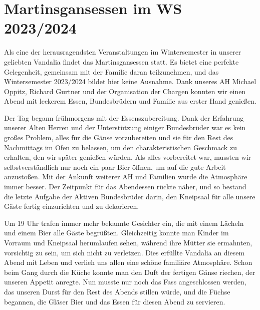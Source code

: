 \section{Martinsgansessen im WS 2023/2024}



\begin{multicols}{2}
Als eine der herausragendsten Veranstaltungen im Wintersemester in unserer geliebten Vandalia findet das Martinsgansessen statt. Es bietet eine perfekte Gelegenheit, gemeinsam mit der Familie daran teilzunehmen, und das Wintersemester 2023/2024 bildet hier keine Ausnahme. Dank unseres AH Michael Oppitz, Richard Gurtner und der Organisation der Chargen konnten wir einen Abend mit leckerem Essen, Bundesbrüdern und Familie aus erster Hand genießen.

Der Tag begann frühmorgens mit der Essenszubereitung. Dank der Erfahrung unserer Alten Herren und der Unterstützung einiger Bundesbrüder war es kein großes Problem, alles für die Gänse vorzubereiten und sie für den Rest des Nachmittags im Ofen zu belassen, um den charakteristischen Geschmack zu erhalten, den wir später genießen würden. Als alles vorbereitet war, mussten wir selbstverständlich nur noch ein paar Bier öffnen, um auf die gute Arbeit anzustoßen. Mit der Ankunft weiterer AH und Familien wurde die Atmosphäre immer besser. Der Zeitpunkt für das Abendessen rückte näher, und so bestand die letzte Aufgabe der Aktiven Bundesbrüder darin, den Kneipsaal für alle unsere Gäste fertig einzurichten und zu dekorieren.

Um 19 Uhr trafen immer mehr bekannte Gesichter ein, die mit einem Lächeln und einem Bier alle Gäste begrüßten. Gleichzeitig konnte man Kinder im Vorraum und Kneipsaal herumlaufen sehen, während ihre Mütter sie ermahnten, vorsichtig zu sein, um sich nicht zu verletzen. Dies erfüllte Vandalia an diesem Abend mit Leben und verlieh uns allen eine schöne familiäre Atmosphäre. Schon beim Gang durch die Küche konnte man den Duft der fertigen Gänse riechen, der unseren Appetit anregte. Nun musste nur noch das Fass angeschlossen werden, das unseren Durst für den Rest des Abends stillen würde, und die Füchse begannen, die Gläser Bier und das Essen für diesen Abend zu servieren.


\end{multicols}
